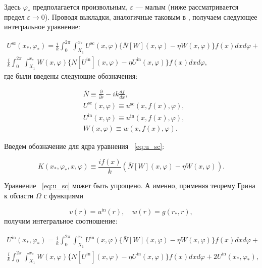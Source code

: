 Здесь $\varphi_*$ предполагается произвольным, $\varepsilon$ — малым (ниже рассматривается предел $\varepsilon \rightarrow 0$). Проводя выкладки, аналогичные таковым в \cite{Shanin2017}, получаем следующее интегральное уравнение:

\begin{multline}
\label{eq:u_sc}
U^{\text{sc}}(x_*, \varphi_*) = \frac{i}{k} \int_{0}^{2\pi} \int_{X_1}^{x_*} U^{\text{sc}}(x,\varphi) \{\bar{N}\left[W\right](x,\varphi) - \eta W(x, \varphi) \} f(x) dx d\varphi + \\
\frac{i}{k} \int_{0}^{2\pi} \int_{X_1}^{x_*} W(x, \varphi) \{ N \left[U^{\text{in}} \right] (x, \varphi)  - \eta U^{\text{in}}(x, \varphi) \} f(x) dx d\varphi,
\end{multline}
где были введены следующие обозначения:

\begin{eqnarray}
&\bar{N} \equiv \frac{\partial}{\partial r} - ik \frac{df}{dx}, \\
&U^{\text{sc}} (x, \varphi) \equiv u^{\text{sc}}(x, f(x), \varphi), \\
&U^{\text{in}} (x, \varphi) \equiv u^{\text{in}}(x, f(x), \varphi), \\
& W(x, \varphi) \equiv w(x, f(x), \varphi).
\end{eqnarray}

Введем обозначение для ядра уравнения ~\eqref{eq:u_sc}:

\begin{equation}
\label{eq:obosn_dlya_yadra}
K(x_*, \varphi_*, x, \varphi) \equiv \frac{i f(x)}{k} ( \bar{N} \left[W\right] (x,\varphi) - \eta W(x, \varphi) ).
\end{equation}

Уравнение ~\eqref{eq:u_sc} может быть упрощено. А именно, применяя теорему Грина к области $\Omega$ с функциями

$$v(r) = u^{\text{in}}(r), \quad w(r) = g(r_*, r),$$
получим интегральное соотношение:

\begin{multline}
\label{eq:u_in}
U^{\text{in}}(x_*, \varphi_*) = \frac{i}{k} \int_{0}^{2\pi} \int_{X_1}^{x_*} U^{\text{in}}(x,\varphi) \{\bar{N}\left[W\right](x,\varphi) - \eta W(x, \varphi) \} f(x) dx d\varphi + \\
\frac{i}{k} \int_{0}^{2\pi} \int_{X_1}^{x_*} W(x, \varphi) \{ N \left[U^{\text{in}} \right] (x, \varphi)  - \eta U^{\text{in}}(x, \varphi) \} f(x) dx d\varphi + 2 U^{\text{in}}(x_*, \varphi_*),
\end{multline}

